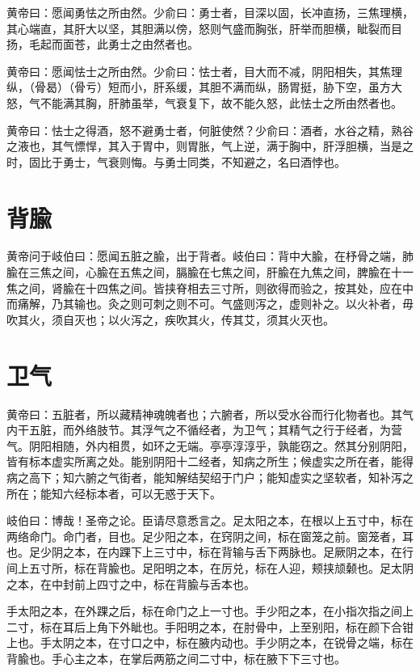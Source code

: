 \documentclass[12pt,UTF8]{ctexbook}
\begin{document}
	黄帝曰：愿闻勇怯之所由然。少俞曰：勇士者，目深以固，长冲直扬，三焦理横，其心端直，其肝大以坚，其胆满以傍，怒则气盛而胸张，肝举而胆横，眦裂而目扬，毛起而面苍，此勇士之由然者也。
	
	黄帝曰：愿闻怯士之所由然。少俞曰：怯士者，目大而不减，阴阳相失，其焦理纵，（骨曷）（骨亏）短而小，肝系缓，其胆不满而纵，肠胃挺，胁下空，虽方大怒，气不能满其胸，肝肺虽举，气衰复下，故不能久怒，此怯士之所由然者也。
	
	黄帝曰：怯士之得酒，怒不避勇士者，何脏使然？少俞曰：酒者，水谷之精，熟谷之液也，其气慓悍，其入于胃中，则胃胀，气上逆，满于胸中，肝浮胆横，当是之时，固比于勇士，气衰则悔。与勇士同类，不知避之，名曰酒悖也。
	\chapter{背腧}
	
	黄帝问于岐伯曰：愿闻五脏之腧，出于背者。岐伯曰：背中大腧，在杼骨之端，肺腧在三焦之间，心腧在五焦之间，膈腧在七焦之间，肝腧在九焦之间，脾腧在十一焦之间，肾腧在十四焦之间。皆挟脊相去三寸所，则欲得而验之，按其处，应在中而痛解，乃其输也。灸之则可刺之则不可。气盛则泻之，虚则补之。以火补者，毋吹其火，须自灭也；以火泻之，疾吹其火，传其艾，须其火灭也。
	\chapter{卫气}
	
	黄帝曰：五脏者，所以藏精神魂魄者也；六腑者，所以受水谷而行化物者也。其气内干五脏，而外络肢节。其浮气之不循经者，为卫气；其精气之行于经者，为营气。阴阳相随，外内相贯，如环之无端。亭亭淳淳乎，孰能窃之。然其分别阴阳，皆有标本虚实所离之处。能别阴阳十二经者，知病之所生；候虚实之所在者，能得病之高下；知六腑之气街者，能知解结契绍于门户；能知虚实之坚软者，知补泻之所在；能知六经标本者，可以无惑于天下。
	
	岐伯曰：博哉！圣帝之论。臣请尽意悉言之。足太阳之本，在根以上五寸中，标在两络命门。命门者，目也。足少阳之本，在窍阴之间，标在窗笼之前。窗笼者，耳也。足少阴之本，在内踝下上三寸中，标在背输与舌下两脉也。足厥阴之本，在行间上五寸所，标在背腧也。足阳明之本，在厉兑，标在人迎，颊挟颃颡也。足太阴之本，在中封前上四寸之中，标在背腧与舌本也。
	
	手太阳之本，在外踝之后，标在命门之上一寸也。手少阳之本，在小指次指之间上二寸，标在耳后上角下外眦也。手阳明之本，在肘骨中，上至别阳，标在颜下合钳上也。手太阴之本，在寸口之中，标在腋内动也。手少阴之本，在锐骨之端，标在背腧也。手心主之本，在掌后两筋之间二寸中，标在腋下下三寸也。
	
\end{document}
